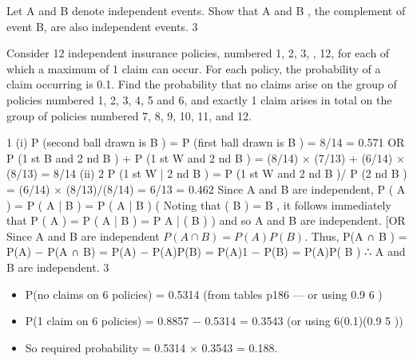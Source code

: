 \documentclass[a4paper,12pt]{article}
\begin{document}

Let A and B denote independent events.
Show that A and B , the complement of event B, are also independent events.
3

Consider 12 independent insurance policies, numbered 1, 2, 3, , 12, for each of which a maximum of 1 claim can occur. For each policy, the probability of a claim occurring is 0.1.
Find the probability that no claims arise on the group of policies numbered 1, 2, 3, 4, 5 and 6, and exactly 1 claim arises in total on the group of policies numbered 7, 8, 9, 10, 11, and 12.

1
(i)
P (second ball drawn is B ) = P (first ball drawn is B ) = 8/14 = 0.571
OR P (1 st B and 2 nd B ) + P (1 st W and 2 nd B )
= (8/14) × (7/13) + (6/14) × (8/13) = 8/14
(ii)
2
P (1 st W | 2 nd B ) = P (1 st W and 2 nd B )/ P (2 nd B ) = (6/14) × (8/13)/(8/14)
= 6/13 = 0.462
Since A and B are independent, P ( A ) = P ( A | B ) = P ( A | B )
(
Noting that ( B ) = B , it follows immediately that P ( A ) = P ( A | B ) = P A | ( B )
)
and so A and B are independent.
[OR
Since A and B are independent $P (A \cap B) = P(A)P(B)$.
Thus,
P(A ∩ B ) = P(A) − P(A ∩ B) = P(A) − P(A)P(B) = P(A){1 − P(B)} = P(A)P( B )
∴ A and B are independent.
3
\begin{itemize}
\item P(no claims on 6 policies) = 0.5314 (from tables p186 — or using 0.9 6 )
\item P(1 claim on 6 policies) = 0.8857 − 0.5314 = 0.3543 (or using 6(0.1)(0.9 5 ))
\item So required probability = 0.5314 × 0.3543 = 0.188.
\end{itemize}
\end{document}
